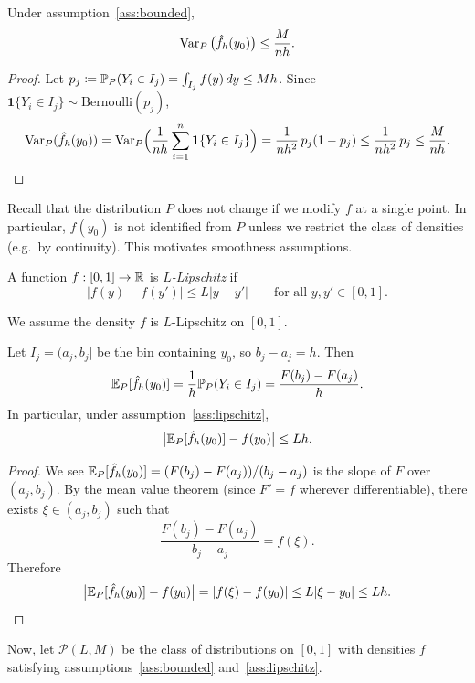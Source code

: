 \begin{lemma}\label{lem:var_hist}
	Under assumption~\ref{ass:bounded},
	\[
		\Var_P\big(\hat f_h(y_0)\big)\le \frac{M}{nh}.
	\]
\end{lemma}

\begin{proof}
	Let $p_j\coloneqq\P_P(Y_i\in I_j)=\int_{I_j} f(y)\,dy\le Mh$. Since $\mathbf 1\{Y_i\in I_j\}\sim\mathrm{Bernoulli}(p_j)$,
	\[
		\Var_P(\hat f_h(y_0))
		=
		\Var_P\!\Big(\frac{1}{nh}\sum_{i=1}^n \mathbf 1\{Y_i\in I_j\}\Big)
		=
		\frac{1}{n h^2}\,p_j(1-p_j)
		\le
		\frac{1}{n h^2}\,p_j
		\le
		\frac{M}{nh}.
	\]
\end{proof}

Recall that the distribution $P$ does not change if we modify $f$ at a single point. In particular, $f(y_0)$ is not identified
from $P$ unless we restrict the class of densities (e.g.\ by continuity). This motivates smoothness assumptions.

\begin{definition}
	A function $f:[0,1]\to\R$ is \emph{$L$-Lipschitz} if
	\[
		|f(y)-f(y')|\le L|y-y'|
		\qquad
		\text{for all } y,y'\in[0,1].
	\]
\end{definition}

\begin{assumption}\label{ass:lipschitz}
	We assume the density $f$ is $L$-Lipschitz on $[0,1]$.
\end{assumption}

\begin{lemma}\label{lem:bias_expr}
	Let $I_j=(a_j,b_j]$ be the bin containing $y_0$, so $b_j-a_j=h$.
	Then
	\[
		\E_P[\hat f_h(y_0)]
		=
		\frac{1}{h}\P_P(Y_i\in I_j)
		=
		\frac{F(b_j)-F(a_j)}{h}.
	\]
	In particular, under assumption~\ref{ass:lipschitz},
	\[
		\big|\E_P[\hat f_h(y_0)]-f(y_0)\big|\le Lh.
	\]
\end{lemma}

\begin{proof}
	We see $\E_P[\hat f_h(y_0)]=(F(b_j)-F(a_j))/(b_j-a_j)$ is the slope of $F$ over $(a_j,b_j)$.
	By the mean value theorem (since $F' = f$ wherever differentiable), there exists $\xi\in(a_j,b_j)$ such that
	\[
		\frac{F(b_j)-F(a_j)}{b_j-a_j}=f(\xi).
	\]
	Therefore
	\[
		\big|\E_P[\hat f_h(y_0)]-f(y_0)\big|
		=
		|f(\xi)-f(y_0)|
		\le
		L|\xi-y_0|
		\le
		Lh.
	\]
\end{proof}

Now, let $\mathscr P(L,M)$ be the class of distributions on $[0,1]$ with densities $f$ satisfying assumptions~\ref{ass:bounded} and~\ref{ass:lipschitz}.

